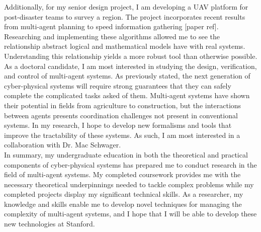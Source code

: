 \documentclass[]{article}
\begin{document}
Additionally, for my senior design project, I am developing a UAV platform for post-disaster teams to survey a region. The project incorporates recent results from multi-agent planning to speed information gathering [paper ref].  Researching and implementing these algorithms allowed me to see the relationship abstract logical and mathematical models have with real systems. Understanding this relationship yields a more robust tool than otherwise possible.\\

As a doctoral candidate, I am most interested in studying the design, verification, and control of multi-agent systems. As previously stated, the next generation of cyber-physical systems will require strong guarantees that they can safely complete the complicated tasks asked of them. Multi-agent systems have shown their potential in fields from agriculture to construction, but the interactions between agents presents coordination challenges not present in conventional systems. In my research, I hope to develop new formalisms and tools that improve the tractability of these systems. As such, I am most interested in a collaboration with Dr. Mac Schwager.\\

In summary, my undergraduate education in both the theoretical and practical components of cyber-physical systems has prepared me to conduct research in the field of multi-agent systems. My completed coursework provides me with the necessary theoretical underpinnings needed to tackle complex problems while my completed projects display my significant technical skills. As a researcher, my knowledge and skills enable me to develop novel techniques for managing the complexity of multi-agent systems, and I hope that I will be able to develop these new technologies at Stanford.

\pagebreak
\end{document}
